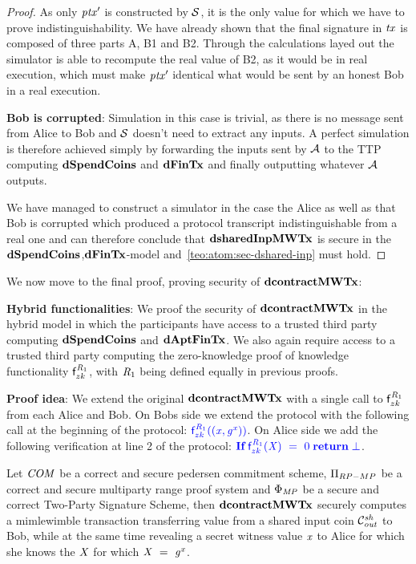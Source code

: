 \begin{proof}
    As only ${\mathit{ptx}}'$ is constructed by $\mathcal{S}$, it is the only value for which we have to prove indistinguishability.
    We have already shown that the final signature in $\mathit{tx}$ is composed of three parts A, B1 and B2.
    Through the calculations layed out the simulator is able to recompute the real value of B2, as it would be in real execution, which must make ${\mathit{ptx}}'$ identical what would be sent by an honest Bob in a real execution.

    \textbf{Bob is corrupted}: Simulation in this case is trivial, as there is no message sent from Alice to Bob and $\mathcal{S}$ doesn't need to extract any inputs.
    A perfect simulation is therefore achieved simply by forwarding the inputs sent by $\mathcal{A}$ to the TTP computing $\mathbf{dSpendCoins}$ and $\mathbf{dFinTx}$ and finally outputting whatever $\mathcal{A}$ outputs.

    We have managed to construct a simulator in the case the Alice as well as that Bob is corrupted which produced a protocol transcript indistinguishable from a real one and can therefore conclude that $\mathbf{dsharedInpMWTx}$ is secure in the $\mathbf{dSpendCoins}$,$\mathbf{dFinTx}$-model and~\cref{teo:atom:sec-dshared-inp} must hold.
\end{proof}

We now move to the final proof, proving security of $\mathbf{dcontractMWTx}$:

\textbf{Hybrid functionalities}: We proof the security of $\mathbf{dcontractMWTx}$ in the hybrid model in which the participants have access to a trusted third party computing $\mathbf{dSpendCoins}$ and $\mathbf{dAptFinTx}$.
We also again require access to a trusted third party computing the zero-knowledge proof of knowledge functionality $\mathsf{f}^{\mathit{R}_1}_{zk}$, with $\mathit{R}_1$ being defined equally in previous proofs.

\textbf{Proof idea}: We extend the original $\mathbf{dcontractMWTx}$ with a single call to $\mathsf{f}^{\mathit{R}_1}_{zk}$ from each Alice and Bob.
On Bobs side we extend the protocol with the following call at the beginning of the protocol: $\color{blue} \mathsf{f}^{\mathit{R}_1}_{zk}((\mathit{x}, \mathit{g}^{\mathit{x}}))$.
On Alice side we add the following verification at line 2 of the protocol: $\color{blue} \textbf{If}\; \mathsf{f}^{\mathit{R}_1}_{zk}(\mathit{X}) ~=~ 0 \; \textbf{return}\; \bot$.

\begin{theorem}
    \label{teo:atom:sec-dcontract-mw}
    Let $\mathit{COM}$ be a correct and secure pedersen commitment scheme, $\Pi_{RP-MP}$ be a correct and secure multiparty range proof system and $\Phi_{\mathit{MP}}$ be a secure and correct Two-Party Signature Scheme, then $\mathbf{dcontractMWTx}$ securely computes a mimlewimble transaction transferring value from a shared input coin $\mathcal{C}_{\mathit{out}}^{\mathit{sh}}$ to Bob, while at the same time revealing a secret witness value $\mathit{x}$ to Alice for which she knows the $\mathit{X}$ for which $\mathit{X} ~=~ \mathit{g}^{\mathit{x}}$.
\end{theorem}

